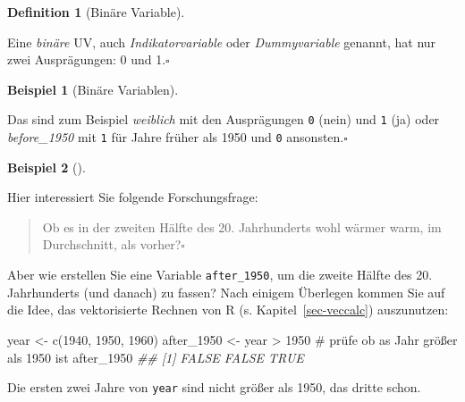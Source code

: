 \documentclass[
  a4paper,
]{scrbook}
\newenvironment{Shaded}{\begin{snugshade}}{\end{snugshade}}
\newcommand{\CommentTok}[1]{\textcolor[rgb]{0.37,0.37,0.37}{#1}}
\newcommand{\DecValTok}[1]{\textcolor[rgb]{0.68,0.00,0.00}{#1}}
\newcommand{\DocumentationTok}[1]{\textcolor[rgb]{0.37,0.37,0.37}{\textit{#1}}}
\newcommand{\FunctionTok}[1]{\textcolor[rgb]{0.28,0.35,0.67}{#1}}
\newcommand{\NormalTok}[1]{\textcolor[rgb]{0.00,0.23,0.31}{#1}}
\newcommand{\OtherTok}[1]{\textcolor[rgb]{0.00,0.23,0.31}{#1}}
\newcommand{\SpecialCharTok}[1]{\textcolor[rgb]{0.37,0.37,0.37}{#1}}
\theoremstyle{definition}
\newtheorem{example}{Beispiel}[chapter]
\theoremstyle{definition}
\newtheorem{definition}{Definition}[chapter]
\theoremstyle{definition}
\theoremstyle{remark}
\begin{document}
\begin{definition}[Binäre
Variable]\protect\hypertarget{def-binvar}{}\label{def-binvar}

Eine \emph{binäre} UV, auch \emph{Indikatorvariable} oder
\emph{Dummyvariable} genannt, hat nur zwei Ausprägungen: 0 und
1.\(\square\)

\end{definition}

\begin{example}[Binäre
Variablen]\protect\hypertarget{exm-bin}{}\label{exm-bin}

Das sind zum Beispiel \emph{weiblich} mit den Ausprägungen \texttt{0}
(nein) und \texttt{1} (ja) oder \emph{before\_1950} mit \texttt{1} für
Jahre früher als 1950 und \texttt{0} ansonsten.\(\square\)

\end{example}

\begin{example}[]\protect\hypertarget{exm-binuv}{}\label{exm-binuv}

Hier interessiert Sie folgende Forschungsfrage:

\begin{quote}
{} Ob es in der zweiten Hälfte des 20. Jahrhunderts wohl
wärmer warm, im Durchschnitt, als vorher?\(\square\)
\end{quote}

\end{example}

Aber wie erstellen Sie eine Variable \texttt{after\_1950}, um die zweite
Hälfte des 20. Jahrhunderts (und danach) zu fassen? Nach einigem
Überlegen kommen Sie auf die Idee, das vektorisierte Rechnen von R (s.
Kapitel~\ref{sec-veccalc}) auszunutzen:

\begin{Shaded}
\begin{Highlighting}[]
\NormalTok{year }\OtherTok{\textless{}{-}} \FunctionTok{c}\NormalTok{(}\DecValTok{1940}\NormalTok{, }\DecValTok{1950}\NormalTok{, }\DecValTok{1960}\NormalTok{)}
\NormalTok{after\_1950 }\OtherTok{\textless{}{-}}\NormalTok{ year }\SpecialCharTok{\textgreater{}} \DecValTok{1950}  \CommentTok{\# prüfe ob as Jahr größer als 1950 ist}
\NormalTok{after\_1950}
\DocumentationTok{\#\# [1] FALSE FALSE  TRUE}
\end{Highlighting}
\end{Shaded}

Die ersten zwei Jahre von \texttt{year} sind nicht größer als 1950, das
dritte schon.
\end{document}
